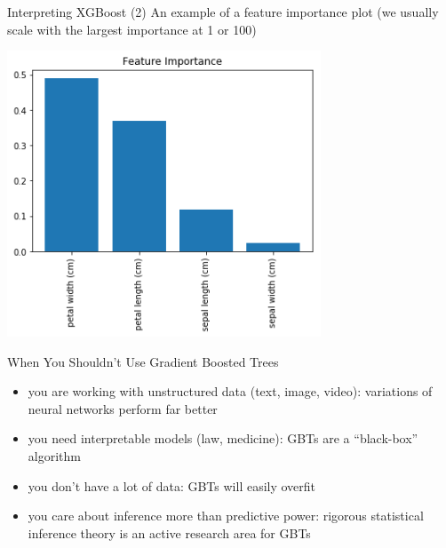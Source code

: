 \documentclass{beamer}
\begin{document}
    \begin{frame}{Interpreting XGBoost (2)}
        An example of a feature importance plot (we usually scale with the largest importance at 1 or 100)

        \begin{center}
            \includegraphics[width=0.7\textwidth]{figures/feature_importance.png}
        \end{center}

    \end{frame}


    \begin{frame}{When You Shouldn't Use Gradient Boosted Trees}
        \begin{itemize}
            \item you are working with unstructured data (text, image, video): variations of neural networks perform far better 
            \item you need interpretable models (law, medicine): GBTs are a ``black-box'' algorithm
            \item you don't have a lot of data: GBTs will easily overfit
            \item you care about inference more than predictive power: rigorous statistical inference theory is an active research area for GBTs
        \end{itemize}
    \end{frame}
\end{document}
